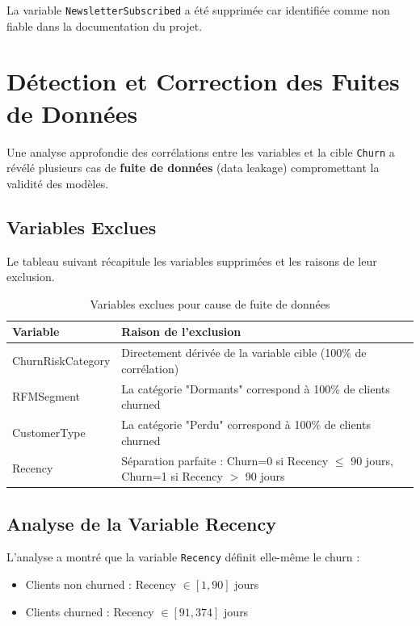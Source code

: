 \documentclass[12pt,a4paper]{article}
\begin{document}
La variable \texttt{NewsletterSubscribed} a été supprimée car identifiée comme non fiable dans la documentation du projet.

\section{Détection et Correction des Fuites de Données}

Une analyse approfondie des corrélations entre les variables et la cible \texttt{Churn} a révélé plusieurs cas de \textbf{fuite de données} (data leakage) compromettant la validité des modèles.

\subsection{Variables Exclues}

Le tableau suivant récapitule les variables supprimées et les raisons de leur exclusion.

\begin{table}[H]
\centering
\begin{tabular}{L{3.5cm}L{9cm}}
\toprule
\textbf{Variable} & \textbf{Raison de l'exclusion} \\
\midrule
ChurnRiskCategory & Directement dérivée de la variable cible (100\% de corrélation) \\
RFMSegment & La catégorie "Dormants" correspond à 100\% de clients churned \\
CustomerType & La catégorie "Perdu" correspond à 100\% de clients churned \\
Recency & Séparation parfaite : Churn=0 si Recency $\leq$ 90 jours, Churn=1 si Recency $>$ 90 jours \\
\bottomrule
\end{tabular}
\caption{Variables exclues pour cause de fuite de données}
\end{table}

\subsection{Analyse de la Variable Recency}

L'analyse a montré que la variable \texttt{Recency} définit elle-même le churn :
\begin{itemize}
    \item Clients non churned : Recency $\in [1, 90]$ jours
    \item Clients churned : Recency $\in [91, 374]$ jours
\end{itemize}
\end{document}
